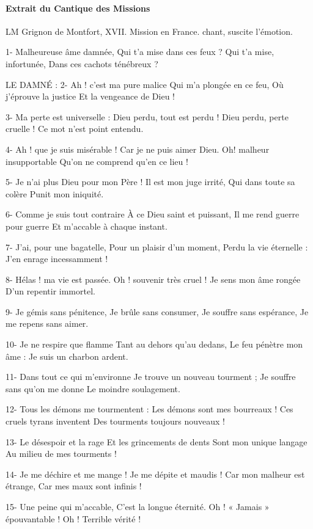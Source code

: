 \paragraph{Extrait du Cantique des Missions} LM Grignon de Montfort, XVII. Mission en France. chant, suscite l'émotion. 
\begin{singlequote}
 1- Malheureuse âme damnée,
Qui t’a mise dans ces feux ?
Qui t’a mise, infortunée,
Dans ces cachots ténébreux ?

LE DAMNÉ :
2- Ah ! c’est ma pure malice
Qui m’a plongée en ce feu,
Où j’éprouve la justice
Et la vengeance de Dieu !

3- Ma perte est universelle :
Dieu perdu, tout est perdu !
Dieu perdu, perte cruelle !
Ce mot n’est point entendu.

4- Ah ! que je suis misérable !
Car je ne puis aimer Dieu.
Oh! malheur insupportable
Qu’on ne comprend qu’en ce lieu !

5- Je n’ai plus Dieu pour mon Père !
Il est mon juge irrité,
Qui dans toute sa colère
Punit mon iniquité.

6- Comme je suis tout contraire
À ce Dieu saint et puissant,
Il me rend guerre pour guerre
Et m’accable à chaque instant.

7- J’ai, pour une bagatelle,
Pour un plaisir d’un moment,
Perdu la vie éternelle :
J’en enrage incessamment !

8- Hélas ! ma vie est passée.
Oh ! souvenir très cruel !
Je sens mon âme rongée
D’un repentir immortel.

9- Je gémis sans pénitence,
Je brûle sans consumer,
Je souffre sans espérance,
Je me repens sans aimer.

10- Je ne respire que flamme
Tant au dehors qu’au dedans,
Le feu pénètre mon âme :
Je suis un charbon ardent.

11- Dans tout ce qui m’environne
Je trouve un nouveau tourment ;
Je souffre sans qu’on me donne
Le moindre soulagement.

12- Tous les démons me tourmentent :
Les démons sont mes bourreaux !
Ces cruels tyrans inventent
Des tourments toujours nouveaux !

13- Le désespoir et la rage
Et les grincements de dents
Sont mon unique langage
Au milieu de mes tourments !

14- Je me déchire et me mange !
Je me dépite et maudis !
Car mon malheur est étrange,
Car mes maux sont infinis !

15- Une peine qui m’accable,
C’est la longue éternité.
Oh ! « Jamais » épouvantable !
Oh ! Terrible vérité !


\end{singlequote}
